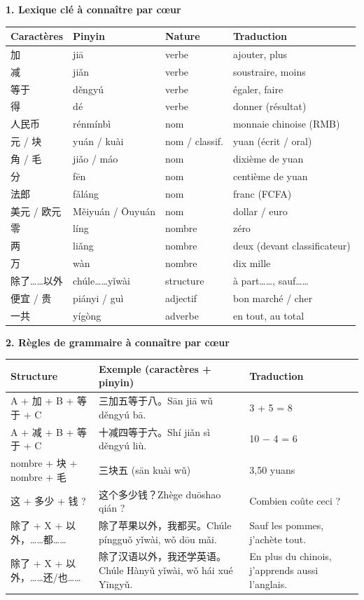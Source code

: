 \documentclass[11pt]{article}
\begin{document}
\begin{bilan}
\textbf{1. Lexique clé à connaître par cœur}
\begin{center}
\begin{tabularx}{\linewidth}{|X|X|X|X|}
\hline
\rowcolor{popblueL} Caractères & Pinyin & Nature & Traduction \\
\hline
加 & jiā & verbe & ajouter, plus \\
\hline
减 & jiǎn & verbe & soustraire, moins \\
\hline
等于 & děngyú & verbe & égaler, faire \\
\hline
得 & dé & verbe & donner (résultat) \\
\hline
人民币 & rénmínbì & nom & monnaie chinoise (RMB) \\
\hline
元 / 块 & yuán / kuài & nom / classif. & yuan (écrit / oral) \\
\hline
角 / 毛 & jiǎo / máo & nom & dixième de yuan \\
\hline
分 & fēn & nom & centième de yuan \\
\hline
法郎 & fǎláng & nom & franc (FCFA) \\
\hline
美元 / 欧元 & Měiyuán / Ōuyuán & nom & dollar / euro \\
\hline
零 & líng & nombre & zéro \\
\hline
两 & liǎng & nombre & deux (devant classificateur) \\
\hline
万 & wàn & nombre & dix mille \\
\hline
除了……以外 & chúle……yǐwài & structure & à part……, sauf…… \\
\hline
便宜 / 贵 & piányi / guì & adjectif & bon marché / cher \\
\hline
一共 & yígòng & adverbe & en tout, au total \\
\hline
\end{tabularx}
\end{center}

\textbf{2. Règles de grammaire à connaître par cœur}
\begin{center}
\begin{tabularx}{\linewidth}{|X|X|X|}
\hline
\rowcolor{popblueL} Structure & Exemple (caractères + pinyin) & Traduction \\
\hline
A + 加 + B + 等于 + C & 三加五等于八。Sān jiā wǔ děngyú bā. & 3 + 5 = 8 \\
\hline
A + 减 + B + 等于 + C & 十减四等于六。Shí jiǎn sì děngyú liù. & 10 − 4 = 6 \\
\hline
nombre + 块 + nombre + 毛 & 三块五 (sān kuài wǔ) & 3,50 yuans \\
\hline
这 + 多少 + 钱 ? & 这个多少钱？Zhège duōshao qián ? & Combien coûte ceci ? \\
\hline
除了 + X + 以外，……都…… & 除了苹果以外，我都买。Chúle píngguǒ yǐwài, wǒ dōu mǎi. & Sauf les pommes, j'achète tout. \\
\hline
除了 + X + 以外，……还/也…… & 除了汉语以外，我还学英语。Chúle Hànyǔ yǐwài, wǒ hái xué Yīngyǔ. & En plus du chinois, j'apprends aussi l'anglais. \\
\hline
\end{tabularx}
\end{center}


\end{bilan}
\end{document}

